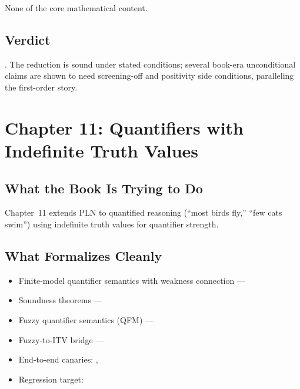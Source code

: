 \documentclass[11pt,openany]{report}
\begin{document}
None of the core mathematical content.

\section{Verdict}

\verdictCorrected{}.  The reduction is sound under stated conditions;
several book-era unconditional claims are shown to need screening-off
and positivity side conditions, paralleling the first-order story.


\chapter{Chapter 11: Quantifiers with Indefinite Truth Values}
\label{ch:review-ch11}

\section{What the Book Is Trying to Do}

Chapter~11 extends PLN to quantified reasoning (``most birds fly,''
``few cats swim'') using indefinite truth values for quantifier
strength.

\section{What Formalizes Cleanly}

\begin{itemize}
\item Finite-model quantifier semantics with weakness connection ---
\item Soundness theorems ---
\item Fuzzy quantifier semantics (QFM) ---
\item Fuzzy-to-ITV bridge ---
\item End-to-end canaries:
  ,
\item Regression target:
\end{itemize}
\end{document}
